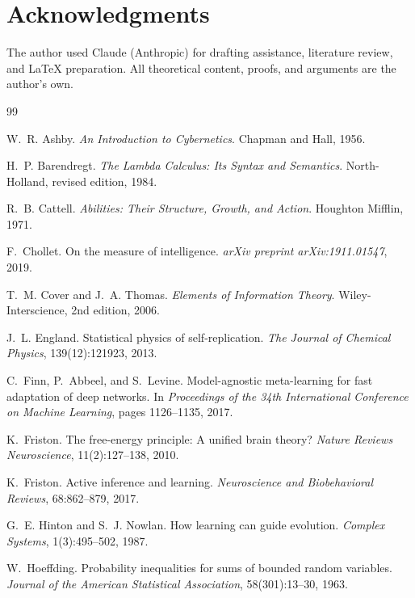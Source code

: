 \documentclass[11pt]{article}
\theoremstyle{definition}
\theoremstyle{remark}
\begin{document}
\section*{Acknowledgments}

The author used Claude (Anthropic) for drafting assistance, literature review, and \LaTeX{} preparation. All theoretical content, proofs, and arguments are the author's own.


\begin{thebibliography}{99}

W.~R. Ashby.
\newblock \emph{An Introduction to Cybernetics}.
\newblock Chapman and Hall, 1956.

H.~P. Barendregt.
\newblock \emph{The Lambda Calculus: Its Syntax and Semantics}.
\newblock North-Holland, revised edition, 1984.

R.~B. Cattell.
\newblock \emph{Abilities: Their Structure, Growth, and Action}.
\newblock Houghton Mifflin, 1971.

F.~Chollet.
\newblock On the measure of intelligence.
\newblock \emph{arXiv preprint arXiv:1911.01547}, 2019.

T.~M. Cover and J.~A. Thomas.
\newblock \emph{Elements of Information Theory}.
\newblock Wiley-Interscience, 2nd edition, 2006.



J.~L. England.
\newblock Statistical physics of self-replication.
\newblock \emph{The Journal of Chemical Physics}, 139(12):121923, 2013.

C.~Finn, P.~Abbeel, and S.~Levine.
\newblock Model-agnostic meta-learning for fast adaptation of deep networks.
\newblock In \emph{Proceedings of the 34th International Conference on Machine
  Learning}, pages 1126--1135, 2017.

K.~Friston.
\newblock The free-energy principle: A unified brain theory?
\newblock \emph{Nature Reviews Neuroscience}, 11(2):127--138, 2010.

K.~Friston.
\newblock Active inference and learning.
\newblock \emph{Neuroscience and Biobehavioral Reviews}, 68:862--879, 2017.

G.~E. Hinton and S.~J. Nowlan.
\newblock How learning can guide evolution.
\newblock \emph{Complex Systems}, 1(3):495--502, 1987.

W.~Hoeffding.
\newblock Probability inequalities for sums of bounded random variables.
\newblock \emph{Journal of the American Statistical Association},
  58(301):13--30, 1963.


\end{thebibliography}
\end{document}
